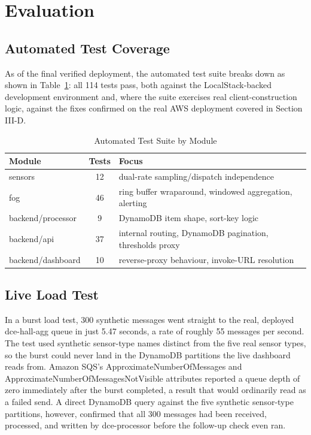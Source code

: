 \documentclass[conference]{IEEEtran}
\begin{document}
\section{Evaluation}

\subsection{Automated Test Coverage}
As of the final verified deployment, the automated test suite breaks down as shown in Table~\ref{tab:tests}: all 114 tests pass, both against the LocalStack-backed development environment and, where the suite exercises real client-construction logic, against the fixes confirmed on the real AWS deployment covered in Section III-D.

\begin{table}[!t]
\caption{Automated Test Suite by Module}
\label{tab:tests}
\centering
\footnotesize
\begin{tabular}{@{}lcp{}@{}}
\hline
\textbf{Module} & \textbf{Tests} & \textbf{Focus} \\
\hline
sensors & 12 & dual-rate sampling/dispatch independence \\
fog & 46 & ring buffer wraparound, windowed aggregation, alerting \\
backend/processor & 9 & DynamoDB item shape, sort-key logic \\
backend/api & 37 & internal routing, DynamoDB pagination, thresholds proxy \\
backend/dashboard & 10 & reverse-proxy behaviour, invoke-URL resolution \\
\hline
\end{tabular}
\end{table}

\subsection{Live Load Test}
In a burst load test, 300 synthetic messages went straight to the real, deployed dce-hall-agg queue in just 5.47 seconds, a rate of roughly 55 messages per second. The test used synthetic sensor-type names distinct from the five real sensor types, so the burst could never land in the DynamoDB partitions the live dashboard reads from. Amazon SQS's ApproximateNumberOfMessages and ApproximateNumberOfMessagesNotVisible attributes reported a queue depth of zero immediately after the burst completed, a result that would ordinarily read as a failed send. A direct DynamoDB query against the five synthetic sensor-type partitions, however, confirmed that all 300 messages had been received, processed, and written by dce-processor before the follow-up check even ran.
\end{document}

